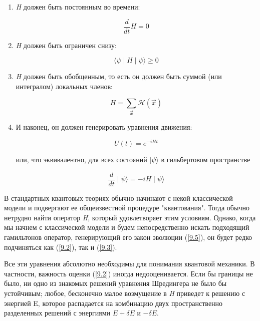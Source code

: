 \documentclass[main.tex]{subfiles}
\begin{document}
\begin{enumerate}
	\item \textit{H} должен быть постоянным во времени: 

	\begin{equation}\label{9.1}
		\frac{d}{dt}H = 0
	\end{equation}

	\item \textit{H} должен быть ограничен снизу: 

	\begin{equation}\label{9.2}
		\langle \psi \mid H \mid \psi \rangle \ge 0 
	\end{equation}

	\item \textit{H} должен быть обобщенным, то есть он должен быть суммой (или интегралом) локальных членов:

	\begin{equation}\label{9.3}
		H = \sum_{\vec x} \mathcal H(\vec x)
	\end{equation}

	\item И наконец, он должен генерировать уравнения движения:

	\begin{equation}\label{9.4}
		U(t) = e^{-iHt}
	\end{equation}

	или, что эквивалентно, для всех состояний $\mid \psi \rangle$ в гильбертовом пространстве

	\begin{equation}\label{9.5}
		\frac{d}{dt} \mid \psi \rangle = -i H \mid \psi \rangle
	\end{equation}

\end{enumerate}

В стандартных квантовых теориях обычно начинают с некой классической модели и подвергают ее общеизвестной процедуре "квантования". Тогда обычно нетрудно найти оператор \textit{H}, который удовлетворяет этим условиям. Однако, когда мы начнем с классической модели и будем непосредственно искать подходящий гамильтонов оператор, генерирующий его закон эволюции (\ref{9.5}), он будет редко подчиняться как (\ref{9.2}), так и (\ref{9.3}).

Все эти уравнения абсолютно необходимы для понимания квантовой механики. В частности, важность оценки (\ref{9.2}) иногда недооценивается. Если бы границы не было, ни одно из знакомых решений уравнения Шредингера не было бы устойчивым; любое, бесконечно малое возмущение в \textit{H} приведет к решению с энергией E, которое распадается на комбинацию двух пространственно разделенных решений с энергиями $E + \delta E$ и $-\delta E$.
\end{document}
